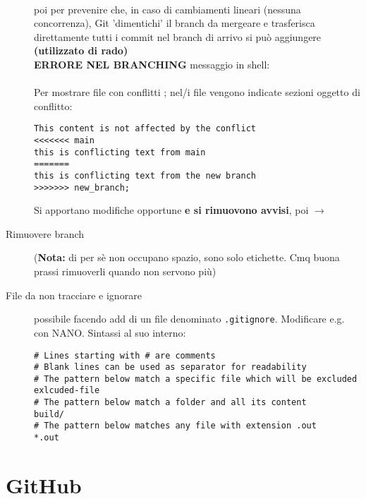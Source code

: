 \documentclass[10pt, oneside]{Book}
\begin{document}
\begin{description}
\\ poi  per prevenire che, in caso di cambiamenti lineari (nessuna concorrenza), Git 'dimentichi' il branch da mergeare e trasferisca direttamente tutti i commit nel branch di arrivo si può aggiungere  \textbf{(utilizzato di rado)}
\\\textbf{ERRORE NEL BRANCHING} messaggio in shell:
\\
\\Per mostrare file con conflitti ;
nel/i file vengono indicate sezioni oggetto di conflitto:
\begin{verbatim}
This content is not affected by the conflict
<<<<<<< main
this is conflicting text from main
=======
this is conflicting text from the new branch
>>>>>>> new_branch;
\end{verbatim}
Si apportano modifiche opportune \textbf{e si rimuovono avvisi}, poi  $\rightarrow$ 
\item[Rimuovere branch]  (\textbf{Nota:} di per sè non occupano spazio, sono solo etichette. Cmq buona prassi rimuoverli quando non servono più)

\item[File da non tracciare e ignorare] possibile facendo add di un file denominato \texttt{.gitignore}. Modificare e.g. con NANO. Sintassi al suo interno:
\begin{verbatim}
# Lines starting with # are comments
# Blank lines can be used as separator for readability
# The pattern below match a specific file which will be excluded
exlcuded-file
# The pattern below match a folder and all its content
build/
# The pattern below matches any file with extension .out
*.out
\end{verbatim} 
\end{description}
\section{GitHub}
\end{document}
